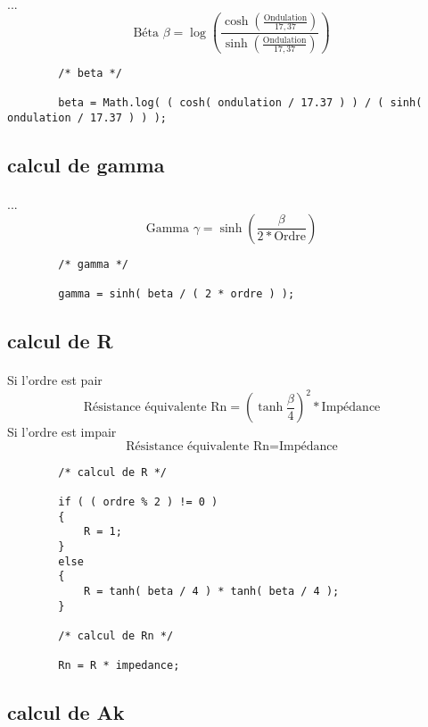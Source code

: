 \documentclass[a4paper,11pt]{article}
\begin{document}
    \paragraph{}
    ...\[ \mbox{Béta } \beta = \log( \frac{ \cosh( \frac{ \mbox{Ondulation} }{17,37} ) } { \sinh( \frac{ \mbox{Ondulation} }{17,37} ) } )\]
    \begin{lstlisting}
        /* beta */

        beta = Math.log( ( cosh( ondulation / 17.37 ) ) / ( sinh( ondulation / 17.37 ) ) );

    \end{lstlisting}

\subsection{calcul de gamma}
    \paragraph{}
    ...\[ \mbox{Gamma } \gamma = \sinh( \frac{ \beta }{ 2 * \mbox{Ordre} } ) \]
    \begin{lstlisting}
        /* gamma */

        gamma = sinh( beta / ( 2 * ordre ) );

    \end{lstlisting}

\subsection{calcul de R}
    \paragraph{}
    Si l'ordre est pair \[ \mbox{Résistance équivalente Rn} = ( \tanh{ \frac{ \beta }{ 4 } } ) ^2 * \mbox{Impédance} \]
    Si l'ordre est impair \[ \mbox{Résistance équivalente Rn} = \mbox{Impédance} \]
    \begin{lstlisting}
        /* calcul de R */

        if ( ( ordre % 2 ) != 0 )
        {
            R = 1;
        }
        else
        {
            R = tanh( beta / 4 ) * tanh( beta / 4 );
        }

        /* calcul de Rn */

        Rn = R * impedance;

    \end{lstlisting}

\subsection{calcul de Ak }
\end{document}
